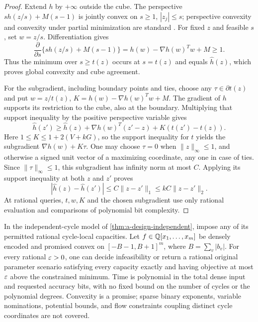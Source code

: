 \begin{proof}
Extend $h$ by $+\infty$ outside the cube.  The perspective
$s h(z/s)+M(s-1)$ is jointly convex on $s\ge1$, $|z_j|\le s$;
perspective convexity and convexity under partial minimization are
standard \citep[Sections 3.2.5--3.2.6]{boyd2004-convex}.
For fixed $z$ and feasible $s$, set $w=z/s$.  Differentiation gives
\[
 \frac{\partial}{\partial s}\{s h(z/s)+M(s-1)\}
   =h(w)-\nabla h(w)^Tw+M\ge1.
\]
Thus the minimum over $s\ge t(z)$ occurs at $s=t(z)$ and equals
$\widehat h(z)$, which proves global convexity and cube agreement.

For the subgradient, including boundary points and ties, choose any
$\tau\in\partial t(z)$ and put $w=z/t(z)$,
$K=h(w)-\nabla h(w)^Tw+M$.  The gradient of $h$ supports its
restriction to the cube, also at the boundary.  Multiplying that
support inequality by the positive perspective variable gives
\[
 \widehat h(z')\ge\widehat h(z)+\nabla h(w)^T(z'-z)
                         +K(t(z')-t(z)).
\]
Here $1\le K\le1+2(V+kG)$, so the support inequality for $t$ yields
the subgradient $\nabla h(w)+K\tau$.  One may choose $\tau=0$ when
$\|z\|_\infty\le1$, and otherwise a signed unit vector of a maximizing
coordinate, any one in case of ties.  Since $\|\tau\|_\infty\le1$,
this subgradient has infinity norm at most $C$.  Applying its support
inequality at both $z$ and $z'$ proves
\[
 |\widehat h(z)-\widehat h(z')|
       \le C\|z-z'\|_1\le kC\|z-z'\|_2.
\]
At rational queries, $t,w,K$ and the chosen subgradient use only
rational evaluation and comparisons of polynomial bit complexity.
\end{proof}

\begin{theorem}
\label{thm:a-design-convex}
In the independent-cycle model of \cref{thm:a-design-independent},
impose any of its permitted rational cycle-local capacities.  Let
$f\in\mathbb{Q}[x_1,\ldots,x_m]$ be densely encoded and promised convex on
$[-B-1,B+1]^m$, where $B=\sum_v|b_v|$.
For every rational $\varepsilon>0$, one can decide infeasibility or return a
rational original parameter scenario satisfying every capacity
exactly and having objective at most $\varepsilon$ above the constrained
minimum.  Time is polynomial in the total dense input and requested
accuracy bits, with no fixed bound on the number of cycles or the
polynomial degrees.  Convexity is a promise; sparse binary exponents,
variable nominations, potential bounds, and flow constraints coupling
distinct cycle coordinates are not covered.
\end{theorem}

